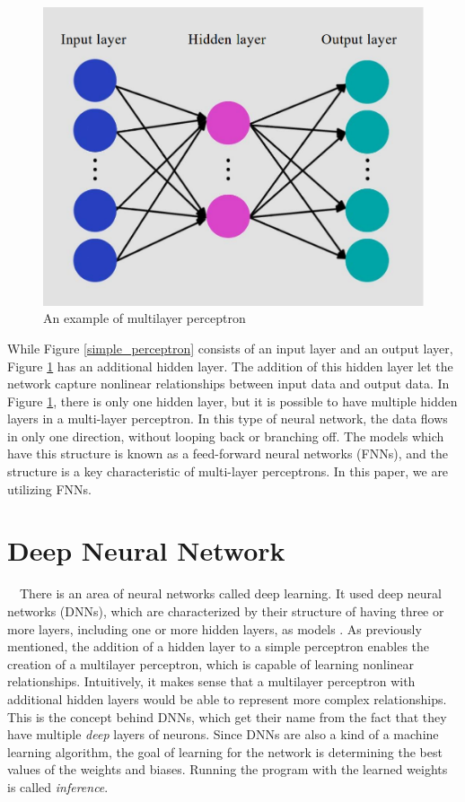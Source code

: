 \begin{figure}[h]
  \centering
  \includegraphics[width=120truemm]{resources/2_background/multi_layer_perceptron.png}
  \caption{
    An example of multilayer perceptron
  }
  \label{multilayer_perceptron}
\end{figure}
While Figure \ref{simple_perceptron} consists of an input layer and an 
output layer, Figure \ref{multilayer_perceptron} has an additional hidden 
layer. The addition of this hidden layer let the network capture nonlinear
relationships between input data and output data.
In Figure \ref{multilayer_perceptron}, there is only one hidden layer,
but it is possible to have multiple hidden layers in a multi-layer perceptron.
In this type of neural network, the data flows in only one direction, without 
looping back or branching off. The models which have this structure is known
as a feed-forward neural networks (FNNs), 
and the structure is a key characteristic of multi-layer perceptrons.
In this paper, we are utilizing FNNs.

\section{Deep Neural Network}
　There is an area of neural networks called deep learning. 
It used deep neural networks (DNNs), which are characterized by their structure
of having three or more layers, including one or more hidden layers, as models \cite{8114708}.
As previously mentioned, the addition of a hidden layer to a simple perceptron 
enables the creation of a multilayer perceptron, which is capable of learning 
nonlinear relationships. 
Intuitively, it makes sense that a multilayer perceptron with additional 
hidden layers would be able to represent more complex relationships.
This is the concept behind DNNs, which get their name from the fact that they 
have multiple \textit{deep} layers of neurons.
Since DNNs are also a kind of a machine learning algorithm, the goal of learning
for the network is determining the best values of the weights and biases. 
Running the program with the learned weights is called \textit{inference}.

